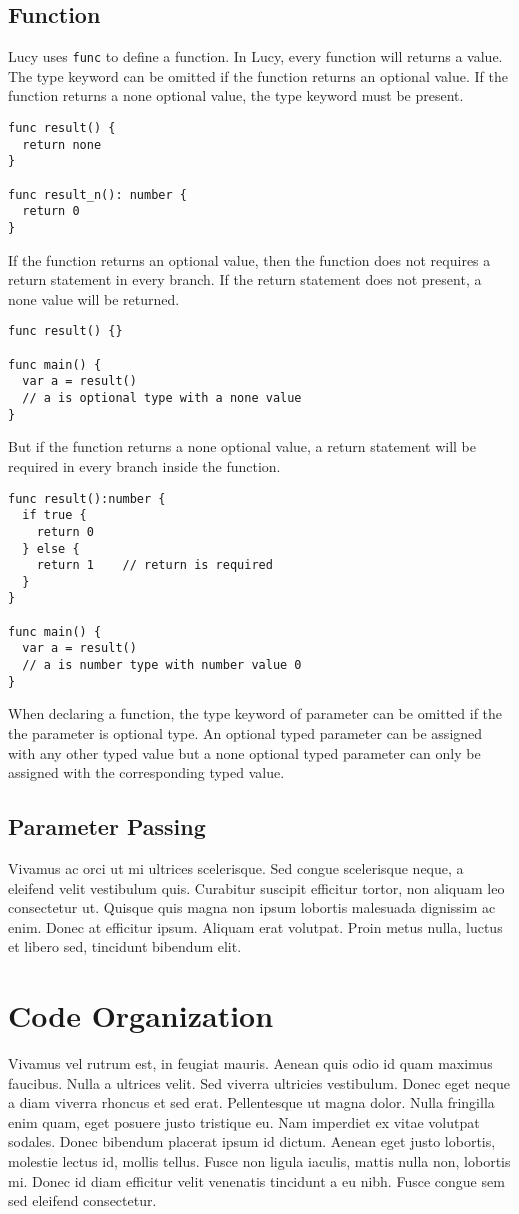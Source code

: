 \subsection{Function}
Lucy uses \texttt{func} to define a function. In Lucy, every function will returns a value. The type keyword can be omitted if the function returns an optional value. If the function returns a none optional value, the type keyword must be present.
\begin{lstlisting}
func result() {
  return none
}

func result_n(): number {
  return 0
}
\end{lstlisting}
If the function returns an optional value, then the function does not requires a return statement in every branch. If the return statement does not present, a none value will be returned.
\begin{lstlisting}
func result() {}

func main() {
  var a = result()
  // a is optional type with a none value
}
\end{lstlisting}
But if the function returns a none optional value, a return statement will be required in every branch inside the function.
\begin{lstlisting}
func result():number {
  if true {
    return 0
  } else {
    return 1    // return is required
  }
}

func main() {
  var a = result()
  // a is number type with number value 0
}
\end{lstlisting}
When declaring a function, the type keyword of parameter can be omitted if the the parameter is optional type. An optional typed parameter can be assigned with any other typed value but a none optional typed parameter can only be assigned with the corresponding typed value.

\subsection{Parameter Passing}
Vivamus ac orci ut mi ultrices scelerisque. Sed congue scelerisque neque, a eleifend velit vestibulum quis. Curabitur suscipit efficitur tortor, non aliquam leo consectetur ut. Quisque quis magna non ipsum lobortis malesuada dignissim ac enim. Donec at efficitur ipsum. Aliquam erat volutpat. Proin metus nulla, luctus et libero sed, tincidunt bibendum elit.


\section{Code Organization}
Vivamus vel rutrum est, in feugiat mauris. Aenean quis odio id quam maximus faucibus. Nulla a ultrices velit. Sed viverra ultricies vestibulum. Donec eget neque a diam viverra rhoncus et sed erat. Pellentesque ut magna dolor. Nulla fringilla enim quam, eget posuere justo tristique eu. Nam imperdiet ex vitae volutpat sodales. Donec bibendum placerat ipsum id dictum. Aenean eget justo lobortis, molestie lectus id, mollis tellus. Fusce non ligula iaculis, mattis nulla non, lobortis mi. Donec id diam efficitur velit venenatis tincidunt a eu nibh. Fusce congue sem sed eleifend consectetur.

